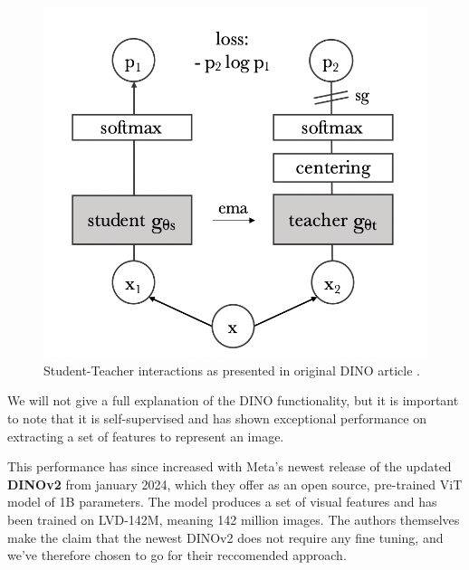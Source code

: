 \begin{figure}[H]
    \centering
    \includegraphics[width=0.7\linewidth]{examples/tests_eb/figs/dino.png}
    \caption{Student-Teacher interactions as presented in original DINO article \cite{dino1}.}
    \label{fig:dino}
\end{figure}

We will not give a full explanation of the DINO functionality, but it is important to note that it is self-supervised and has shown exceptional performance on extracting a set of features to represent an image. 

This performance has since increased with Meta's newest release of the updated \textbf{DINOv2} \cite{dino2} from january 2024, which they offer as an open source, pre-trained ViT model of 1B parameters. The model produces a set of visual features and has been trained on LVD-142M, meaning 142 million images. The authors themselves make the claim that the newest DINOv2 does not require any fine tuning, and we've therefore chosen to go for their reccomended approach. 


%

%
%

%
%
